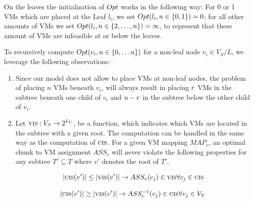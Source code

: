 \documentclass[9pt,twocolumn]{scrartcl}
\newcommand{\Chunk}{\ensuremath{c}}
\newcommand{\VmChunkAssignment}{\ensuremath{ASS_v}}
\newcommand{\NodeMapping}{\ensuremath{MAP_v}}
\newcommand{\VirtualNodes}{\ensuremath{V_V}}
\newcommand{\VirtualNode}{\ensuremath{v}}
\newcommand{\SubstrateNodes}{\ensuremath{V_S}}
\newcommand{\SubstrateNode}{\ensuremath{v}}
\newcommand{\Leaf}{\ensuremath{l}}
\newcommand{\Leaves}{\ensuremath{L}}
\newcommand{\Tree}{\ensuremath{T}}
\newcommand{\Vms}{\ensuremath{n}}
\begin{document}
On the leaves the initialization of $Opt$ works in the following way: For 0 or
1 VMs which are placed at the Leaf $\Leaf_i$, we set $\Opt(\Leaf_i, n \in
\{0,1\}) = 0$; for all other amounts of VMs we set $\Opt(\Leaf_i, n \in
\{2,\dots,\Vms\}) = \infty$, to represent that these amount of VMs are
infeasible at or below the leaves.

To recursively compute $\Opt(\SubstrateNode_i, n \in \{0,\dots\Vms\})$ for a
non-leaf node $\SubstrateNode_i \in \SubstrateNodes / \Leaves$, we leverage the
following observations:

\begin{enumerate}
 \item Since our model does not allow to place VMs at non-leaf nodes,
the problem of placing $n$ VMs beneath $\SubstrateNode_i$, will always result in
placing $r$ VMs in the subtree
beneath one child of $\SubstrateNode_i$ and $n - r$ in the subtree below
the other child of $\SubstrateNode_i$.
\item Let $\VmCount : \SubstrateNodes \rightarrow 2^{\VirtualNodes}$, be a
function, which indicates which VMs are located in the subtree with a given
root. The computation can be handled in the same way as the computation of
$\textsc{cis}$. For a given VM mapping $\NodeMapping$, an optimal chunk to VM
assignment $\VmChunkAssignment$ will never violate the following properties for
any subtree $\Tree' \subseteq \Tree$ where $\SubstrateNode'$ denotes the root of
$\Tree'$.

$$ |\ChunkCount(\SubstrateNode')| \leq |\VmCount(\SubstrateNode')| \rightarrow
\VmChunkAssignment(\Chunk_j) \in \VmCount \forall \Chunk_j \in \ChunkCount$$

$$ |\ChunkCount(\SubstrateNode')| \geq |\VmCount(\SubstrateNode')| \rightarrow
\InverseAssignment(\VirtualNode_j) \in \ChunkCount \forall \VirtualNode_j \in
\VirtualNodes$$
\end{enumerate}
\end{document}
